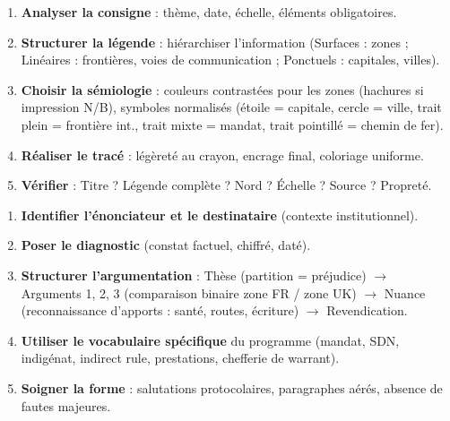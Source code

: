 \documentclass[11pt]{article}
\begin{document}
\begin{methode}
\begin{enumerate}
    \item \textbf{Analyser la consigne} : thème, date, échelle, éléments obligatoires.
    \item \textbf{Structurer la légende} : hiérarchiser l'information (Surfaces : zones ; Linéaires : frontières, voies de communication ; Ponctuels : capitales, villes).
    \item \textbf{Choisir la sémiologie} : couleurs contrastées pour les zones (hachures si impression N/B), symboles normalisés (étoile = capitale, cercle = ville, trait plein = frontière int., trait mixte = mandat, trait pointillé = chemin de fer).
    \item \textbf{Réaliser le tracé} : légèreté au crayon, encrage final, coloriage uniforme.
    \item \textbf{Vérifier} : Titre ? Légende complète ? Nord ? Échelle ? Source ? Propreté.
\end{enumerate}
\end{methode}

\begin{methode}
\begin{enumerate}
    \item \textbf{Identifier l'énonciateur et le destinataire} (contexte institutionnel).
    \item \textbf{Poser le diagnostic} (constat factuel, chiffré, daté).
    \item \textbf{Structurer l'argumentation} : Thèse (partition = préjudice) $\rightarrow$ Arguments 1, 2, 3 (comparaison binaire zone FR / zone UK) $\rightarrow$ Nuance (reconnaissance d'apports : santé, routes, écriture) $\rightarrow$ Revendication.
    \item \textbf{Utiliser le vocabulaire spécifique} du programme (mandat, SDN, indigénat, indirect rule, prestations, chefferie de warrant).
    \item \textbf{Soigner la forme} : salutations protocolaires, paragraphes aérés, absence de fautes majeures.
\end{enumerate}
\end{methode}
\end{document}
